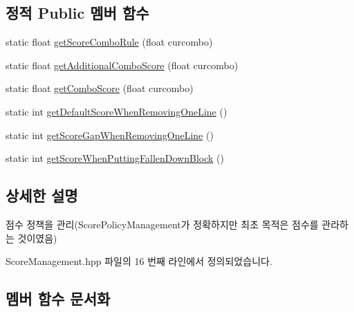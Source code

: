 \subsection*{정적 Public 멤버 함수}
\begin{DoxyCompactItemize}
\item 
static float \hyperlink{class_tetris_1_1_score_manage_1_1_score_management_a41c245dcf773c6c677c2e31f6ac17944}{get\+Score\+Combo\+Rule} (float curcombo)
\item 
static float \hyperlink{class_tetris_1_1_score_manage_1_1_score_management_a66b6a1d3fdc8fb9f91f1d7bfc7854579}{get\+Additional\+Combo\+Score} (float curcombo)
\item 
static float \hyperlink{class_tetris_1_1_score_manage_1_1_score_management_a89203c0689645e7e4ad75d8fd634aa11}{get\+Combo\+Score} (float curcombo)
\item 
static int \hyperlink{class_tetris_1_1_score_manage_1_1_score_management_a1bedf7a989466ad1b6b8b2259eb2eff7}{get\+Default\+Score\+When\+Removing\+One\+Line} ()
\item 
static int \hyperlink{class_tetris_1_1_score_manage_1_1_score_management_a2991c1eb0595da71788aba706e0b27b7}{get\+Score\+Gap\+When\+Removing\+One\+Line} ()
\item 
static int \hyperlink{class_tetris_1_1_score_manage_1_1_score_management_a275253fb7c1bb1820ddba3b666b9db09}{get\+Score\+When\+Putting\+Fallen\+Down\+Block} ()
\end{DoxyCompactItemize}


\subsection{상세한 설명}
점수 정책을 관리(Score\+Policy\+Management가 정확하지만 최초 목적은 점수를 관라하는 것이였음) 

Score\+Management.\+hpp 파일의 16 번째 라인에서 정의되었습니다.



\subsection{멤버 함수 문서화}
\mbox{\label{class_tetris_1_1_score_manage_1_1_score_management_a66b6a1d3fdc8fb9f91f1d7bfc7854579}} 

